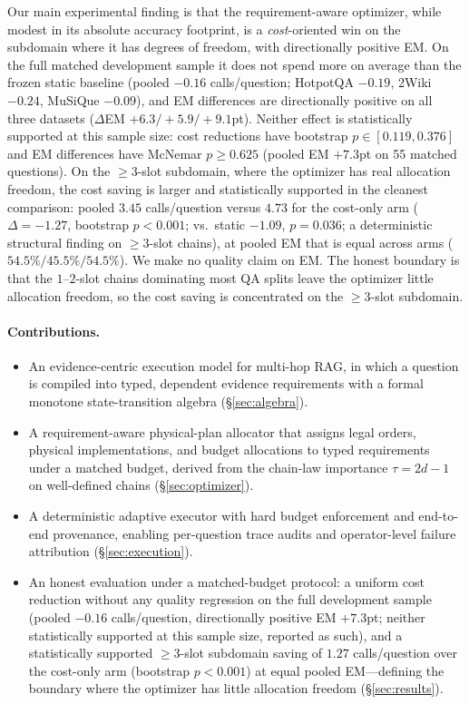 Our main experimental finding is that the requirement-aware optimizer, while
modest in its absolute accuracy footprint, is a \emph{cost}-oriented win on
the subdomain where it has degrees of freedom, with directionally positive
EM. On the full matched development sample it does not spend more on average
than the frozen static baseline (pooled $-0.16$ calls/question; HotpotQA $-0.19$, 2Wiki $-0.24$,
MuSiQue $-0.09$), and EM differences are directionally positive on all three
datasets ($\Delta$EM $+6.3/+5.9/+9.1$pt). Neither effect is statistically
supported at this sample size: cost reductions have bootstrap
$p \in [0.119,0.376]$ and EM differences have McNemar $p \geq 0.625$ (pooled
EM $+7.3$pt on 55 matched questions). On the $\ge 3$-slot subdomain, where the
optimizer has real allocation freedom, the cost saving is larger and
statistically supported in the cleanest comparison: pooled $3.45$ calls/question
versus $4.73$ for the cost-only arm ($\Delta=-1.27$, bootstrap $p<0.001$;
vs.\ static $-1.09$, $p=0.036$; a deterministic structural finding on
$\ge 3$-slot chains), at pooled EM that is equal across arms
($54.5\%/45.5\%/54.5\%$). We make no quality claim on EM. The honest boundary is
that the $1$--$2$-slot chains dominating most QA splits leave the optimizer
little allocation freedom, so the cost saving is concentrated on the
$\ge 3$-slot subdomain.

\paragraph{Contributions.}
\begin{itemize}
\item An evidence-centric execution model for multi-hop RAG, in which a
question is compiled into typed, dependent evidence requirements with a formal
monotone state-transition algebra (\S\ref{sec:algebra}).
\item A requirement-aware physical-plan allocator that assigns legal orders,
physical implementations, and budget allocations to typed requirements under a
matched budget, derived from the chain-law importance
$\tau = 2d-1$ on well-defined chains (\S\ref{sec:optimizer}).
\item A deterministic adaptive executor with hard budget enforcement and
end-to-end provenance, enabling per-question trace audits and operator-level
failure attribution (\S\ref{sec:execution}).
\item An honest evaluation under a matched-budget protocol: a uniform cost
reduction without any quality regression on the full development sample
(pooled $-0.16$ calls/question, directionally positive EM $+7.3$pt; neither
statistically supported at this sample size, reported as such), and a
statistically supported $\ge 3$-slot subdomain saving of $1.27$ calls/question
over the cost-only arm (bootstrap $p<0.001$) at equal pooled EM---defining the
boundary where the optimizer has little allocation freedom
(\S\ref{sec:results}).
\end{itemize}
